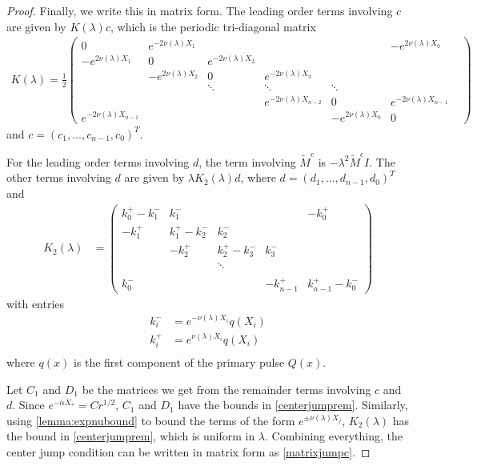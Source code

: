 \documentclass[thesis.tex]{subfiles}
\begin{document}
\begin{lemma}
\begin{proof}
Finally, we write this in matrix form. The leading order terms involving $c$ are given by $K(\lambda)c$, which is the periodic tri-diagonal matrix
\begin{align*}
K(\lambda) = \frac{1}{2}
\begin{pmatrix}
0 & e^{-2\nu(\lambda)X_1} & & & & -e^{2 \nu(\lambda)X_0} \\
-e^{2\nu(\lambda)X_1} & 0 & e^{-2\nu(\lambda)X_2} \\
& -e^{2 \nu(\lambda)X_2} & 0 & e^{-2\nu(\lambda)X_3} \\
& & \ddots & \ddots & \ddots &&  \\
&&& e^{-2\nu(\lambda)X_{n-2}} & 0 & e^{-2\nu(\lambda)X_{n-1}} \\
e^{-2\nu(\lambda)X_{n-1}} & & & & -e^{2 \nu(\lambda)X_0} & 0
\end{pmatrix}
\end{align*}
and $c = (c_1, \dots, c_{n-1}, c_0)^T$.

For the leading order terms involving $d$, the term involving $\tilde{M}^c$ is $-\lambda^2 \tilde{M}^c I$. The other terms involving $d$ are given by $\lambda K_2(\lambda) d$, where $d = (d_1, \dots, d_{n-1}, d_0)^T$ and 
\begin{align*}
K_2(\lambda) &= \begin{pmatrix}
k_0^+ - k_1^- & k_1^- &&& -k_0^+ \\
-k_1^+ & k_1^+ - k_2^- & k_2^- \\
& -k_2^+ & k_2^+ - k_3^- & k_3^- \\ && \ddots \\
\\
k_0^- &&& -k_{n-1}^+ & k_{n-1}^+ - k_0^- 
\end{pmatrix}
\end{align*}
with entries
\begin{align*}
k_i^- &= e^{-\nu(\lambda)X_i} q(X_i)\\
k_i^+ &= e^{\nu(\lambda)X_i} q(X_i)\\
\end{align*}
where $q(x)$ is the first component of the primary pulse $Q(x)$.

Let $C_1$ and $D_1$ be the matrices we get from the remainder terms involving $c$ and $d$. Since $e^{-\alpha X_*} = C r^{1/2}$, $C_1$ and $D_1$ have the bounds in \cref{centerjumprem}. Similarly, using \cref{lemma:expnubound} to bound the terms of the form $e^{\pm \nu(\lambda)X_j}$, $K_2(\lambda)$ has the bound in \cref{centerjumprem}, which is uniform in $\lambda$. Combining everything, the center jump condition can be written in matrix form as \cref{matrixjumpc}.
\end{proof}
\end{lemma}
\end{document}
